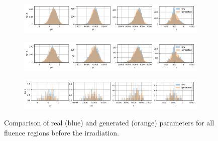 \begin{figure}[H]
\begin{subfigure}[b]{\textwidth}
  \end{subfigure}
\begin{subfigure}[b]{\textwidth}
    \centering
    \includegraphics[width=\linewidth]{figures/chapter4/surrogates/p3_histos_pre_5.png}
  \end{subfigure}
\begin{subfigure}[b]{\textwidth}
    \centering
    \includegraphics[width=\linewidth]{figures/chapter4/surrogates/p3_histos_pre_6.png}
  \end{subfigure}
\begin{subfigure}[b]{\textwidth}
    \centering
    \includegraphics[width=\linewidth]{figures/chapter4/surrogates/p3_histos_pre_7.png}
  \end{subfigure}
  \caption[model pre ir]{Comparison of real (blue) and generated (orange) parameters for all fluence regions before the irradiation.}
  \label{plot:model_s8_pre}
\end{figure}

